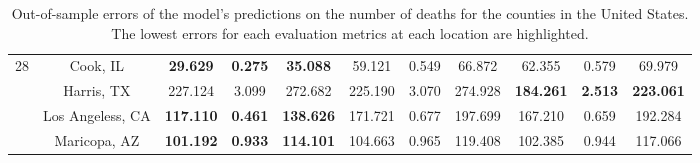 \begin{landscape}
\begin{table}[!htb]
\begin{tabular}{| c | c | c | c | c | c | c | c | c | c | c |}
        \multirow{4}{*}{28}
            & Cook, IL & \textbf{29.629} & \textbf{0.275} & \textbf{35.088} & 59.121 & 0.549 & 66.872 & 62.355 & 0.579 & 69.979 \\
            & Harris, TX & 227.124 & 3.099 & 272.682 & 225.190 & 3.070 & 274.928 & \textbf{184.261} & \textbf{2.513} & \textbf{223.061} \\
            & Los Angeless, CA & \textbf{117.110} & \textbf{0.461} & \textbf{138.626} & 171.721 & 0.677 & 197.699 & 167.210 & 0.659 & 192.284 \\
            & Maricopa, AZ & \textbf{101.192} & \textbf{0.933} & \textbf{114.101} & 104.663 & 0.965 & 119.408 & 102.385 & 0.944 & 117.066 \\ \hline
    \end{tabular}
    \caption{Out-of-sample errors of the model's predictions on the number of deaths for the counties in the United States. The lowest errors for each evaluation metrics at each location are highlighted.}
    \label{tab:errors-us-counties-deaths}
\end{table}
\end{landscape}

